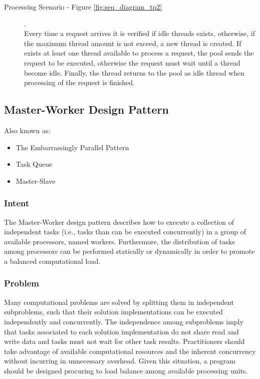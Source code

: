 
\begin{description}
	
	\item[Processing Scenario - Figure \ref{fig:seq_diagram_tp2}].\\
	Every time a request arrives it is verified if idle threads exists, otherwise, if the maximum thread amount is not exceed, a new thread is created. If exists at least one thread available to process a request, the pool sends the request to be executed, otherwise the request must wait until a thread become idle. Finally, the thread returns to the pool as idle thread when processing of the request is finished.
\end{description}


\subsection{Master-Worker Design Pattern}
\label{sebsec:mw_design_pattern}
Also known as:

\begin{itemize}
	\item  The Embarrassingly Parallel Pattern
	\item  Task Queue
	\item  Master-Slave
\end{itemize}

\subsubsection{Intent}
The Master-Worker design pattern describes how to execute a collection of independent tasks (i.e., tasks than can be executed concurrently) in a group of available processors, named workers. Furthermore, the distribution of tasks among processors can be performed statically or dynamically in order to promote a balanced computational load.

\subsubsection{Problem}
Many computational problems are solved by splitting them in independent subproblems, such that their solution implementations can be executed independently and concurrently. The independence among subproblems imply that tasks associated to each solution implementation do not share read and write data and tasks must not wait for other task results. Practitioners should take advantage of available computational resources and the inherent concurrency without incurring in unnecessary overhead. Given this situation, a program should be designed procuring to load balance among available processing units.

